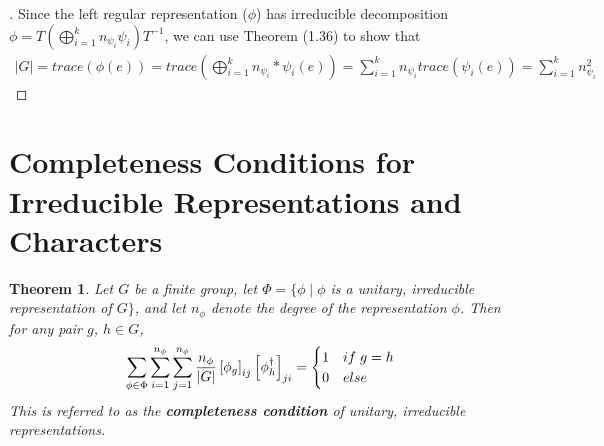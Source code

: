 \documentclass[10pt]{ucthesis}
\newtheorem{theorem}[definition]{Theorem}
\begin{document}
\noindent\begin{proof}[\cite{Tung}] Since the left regular representation ($\phi$) has irreducible decomposition $\phi = T\left(\bigoplus_{i=1}^k n_{\psi_i}\psi_i\right)T^{-1}$, we can use Theorem (1.36) to show that
\begin{equation}
	\begin{aligned}
		|G| = trace(\phi(e)) = trace\left(\bigoplus_{i=1}^k n_{\psi_i}*\psi_i(e)\right) = \sum_{i=1}^k n_{\psi_i}trace(\psi_i(e)) = \sum_{i=1}^k n_{\psi_i}^2 
	\end{aligned}
\end{equation}
\end{proof}

\section{Completeness Conditions for Irreducible Representations and Characters}


\begin{theorem}
	Let $G$ be a finite group, let $\Phi = \{\phi \mid \phi$ is a unitary, irreducible representation of $G\}$, and let $n_\phi$ denote the degree of the representation $\phi$. Then for any pair $g$, $h \in G$, 
$$\sum_{\phi \in \Phi} \sum_{i=1}^{n_\phi} \sum_{j=1}^{n_\phi} \frac{n_\phi}{|G|} \left[\phi_g\right]_{ij}\left[\phi_{h}^\dag\right]_{ji} = \begin{cases}
																										1 & if \hspace{1mm} g = h \\
																										0 & else
																									\end{cases}$$
This is referred to as the \textbf{completeness condition} of unitary, irreducible representations.
\end{theorem}
\end{document}
